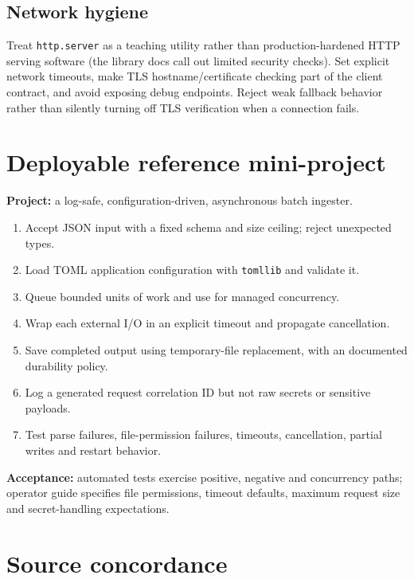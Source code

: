 \documentclass[
  11pt,
]{report}
\newcommand{\passthrough}[1]{#1}
\providecommand{\tightlist}{%
  \setlength{\itemsep}{0pt}\setlength{\parskip}{0pt}}
\begin{document}
\section{Network hygiene}\label{network-hygiene}

Treat \passthrough{\lstinline!http.server!} as a teaching utility rather
than production-hardened HTTP serving software (the library docs call
out limited security checks). Set explicit network timeouts, make TLS
hostname/certificate checking part of the client contract, and avoid
exposing debug endpoints. Reject weak fallback behavior rather than
silently turning off TLS verification when a connection fails.

\chapter{Deployable reference
mini-project}\label{deployable-reference-mini-project}

\textbf{Project:} a log-safe, configuration-driven, asynchronous batch
ingester.

\begin{enumerate}
\def\labelenumi{\arabic{enumi}.}
\tightlist
\item
  Accept JSON input with a fixed schema and size ceiling; reject
  unexpected types.
\item
  Load TOML application configuration with
  \passthrough{\lstinline!tomllib!} and validate it.
\item
  Queue bounded units of work and use
   for managed concurrency.
\item
  Wrap each external I/O in an explicit timeout and propagate
  cancellation.
\item
  Save completed output using temporary-file replacement, with an
  documented durability policy.
\item
  Log a generated request correlation ID but not raw secrets or
  sensitive payloads.
\item
  Test parse failures, file-permission failures, timeouts, cancellation,
  partial writes and restart behavior.
\end{enumerate}

\textbf{Acceptance:} automated tests exercise positive, negative and
concurrency paths; operator guide specifies file permissions, timeout
defaults, maximum request size and secret-handling expectations.

\chapter{Source concordance}\label{source-concordance}
\end{document}
